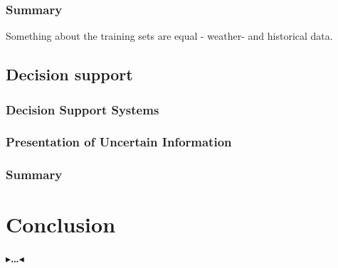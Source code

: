\documentclass[twoside,11pt,openright]{report}
\newcommand{\todo}[1]{{\color[rgb]{.5,0,0}\textbf{$\blacktriangleright$#1$\blacktriangleleft$}}}
\begin{document}
\subsection{Summary}
Something about the training sets are equal - weather- and historical data.

\section{Decision support}
\subsection{Decision Support Systems}

\subsection{Presentation of Uncertain Information}

\subsection{Summary}


\chapter{Conclusion}
\label{ch:conclusion}

\todo{\dots}



 

\end{document}
